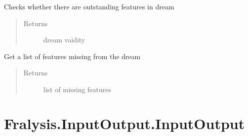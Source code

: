 \documentclass[letterpaper,10pt,english]{sphinxmanual}
\begin{document}
\begin{fulllineitems}
\begin{fulllineitems}
\begin{quote}
\begin{description}
\end{description}\end{quote}

\end{fulllineitems}


\begin{fulllineitems}
\label{\detokenize{index:Fralysis.DreamValidator.DreamValidator.is_valid}}
Checks whether there are outstanding features in dream
\begin{quote}\begin{description}
\item[{Returns}] \leavevmode
dream vaidity

\end{description}\end{quote}

\end{fulllineitems}


\begin{fulllineitems}
\label{\detokenize{index:Fralysis.DreamValidator.DreamValidator.outstanding_features}}
Get a list of features missing from the dream
\begin{quote}\begin{description}
\item[{Returns}] \leavevmode
list of missing features

\end{description}\end{quote}

\end{fulllineitems}


\end{fulllineitems}



\chapter{Fralysis.InputOutput.InputOutput}
\label{\detokenize{index:fralysis-inputoutput-inputoutput}}
\end{document}
